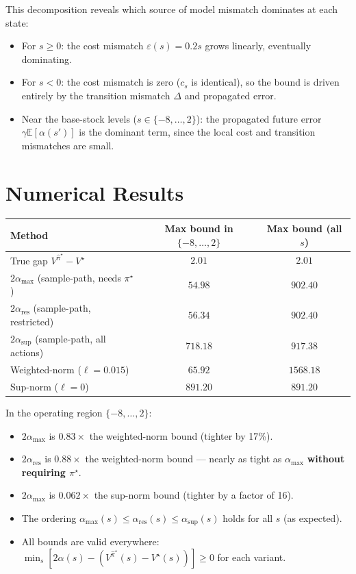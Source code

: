 \documentclass[11pt]{article}
\newcommand{\pistar}{\pi^\star}
\newcommand{\pihatstar}{\hat\pi^\star}
\newcommand{\Vstar}{V^\star}
\newcommand{\Vpihat}{V^{\pihatstar}}
\newcommand{\alphares}{\alpha_{\mathrm{res}}}
\begin{document}
This decomposition reveals which source of model mismatch dominates at each
state:
\begin{itemize}
  \item For $s \ge 0$: the cost mismatch $\varepsilon(s) = 0.2 s$ grows
        linearly, eventually dominating.
  \item For $s < 0$: the cost mismatch is zero ($c_s$ is identical), so the
        bound is driven entirely by the transition mismatch $\Delta$ and
        propagated error.
  \item Near the base-stock levels ($s \in \{-8, \ldots, 2\}$): the propagated
        future error $\gamma \mathbb{E}[\alpha(s')]$ is the dominant term, since
        the local cost and transition mismatches are small.
\end{itemize}

\section{Numerical Results}

\begin{center}
\begin{tabular}{lcc}
\toprule
Method & Max bound in $\{-8,\ldots,2\}$ & Max bound (all $s$) \\
\midrule
True gap $\Vpihat - \Vstar$ & $2.01$ & $2.01$ \\
$2\alpha_{\max}$ (sample-path, needs $\pistar$) & $54.98$ & $902.40$ \\
$2\alphares$ (sample-path, restricted) & $56.34$ & $902.40$ \\
$2\alpha_{\sup}$ (sample-path, all actions) & $718.18$ & $917.38$ \\
Weighted-norm ($\ell = 0.015$) & $65.92$ & $1568.18$ \\
Sup-norm ($\ell = 0$) & $891.20$ & $891.20$ \\
\bottomrule
\end{tabular}
\end{center}

In the operating region $\{-8, \ldots, 2\}$:
\begin{itemize}
  \item $2\alpha_{\max}$ is $\mathbf{0.83\times}$ the weighted-norm bound
        (tighter by 17\%).
  \item $2\alphares$ is $\mathbf{0.88\times}$ the weighted-norm bound ---
        nearly as tight as $\alpha_{\max}$ \textbf{without requiring $\pistar$}.
  \item $2\alpha_{\max}$ is $\mathbf{0.062\times}$ the sup-norm bound (tighter
        by a factor of 16).
  \item The ordering $\alpha_{\max}(s) \le \alphares(s) \le \alpha_{\sup}(s)$
        holds for all $s$ (as expected).
  \item All bounds are valid everywhere: $\min_s [2\alpha(s) - (\Vpihat(s)
        - \Vstar(s))] \ge 0$ for each variant.
\end{itemize}
\end{document}
